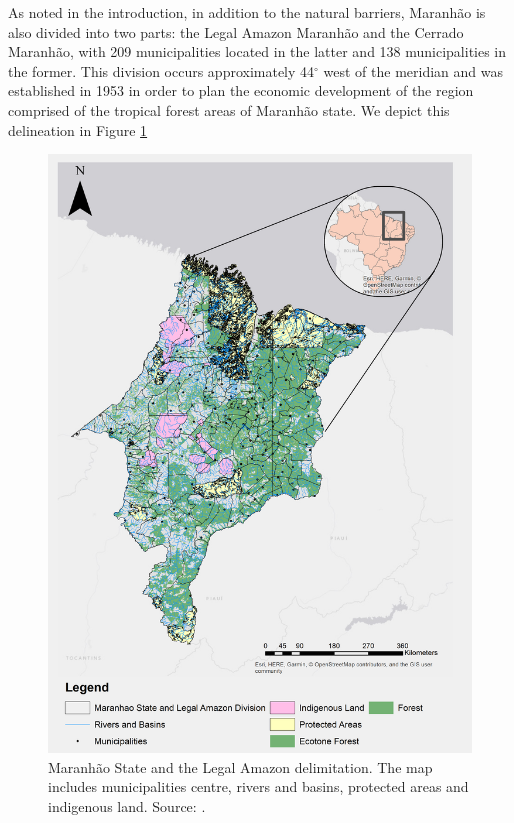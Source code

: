 As noted in the introduction, in addition to the natural barriers, Maranhão is also divided into two parts: the Legal Amazon Maranhão and the Cerrado Maranhão, with 209 municipalities located in the latter and 138 municipalities in the former. This division occurs approximately 44$^{\circ}$ west of the meridian and was established in 1953 in order to plan the economic development of the region comprised of the tropical forest areas of Maranhão state.  We depict this delineation in Figure \ref{fig:delimitacao2}

\begin{figure}[H]
  \centering
  \includegraphics[width=1\textwidth, inner]{MaranhaoChapter2_Fig1.png}
\caption[Maranhão  state and the Legal Amazon delimitation]{Maranhão  State and the Legal Amazon delimitation. The map includes municipalities centre, rivers and basins, protected areas and indigenous land. Source: \citep{MMMAwebsite,nugeo_2018,embrapa_2018}.}
\label{fig:delimitacao2}
\end{figure}

